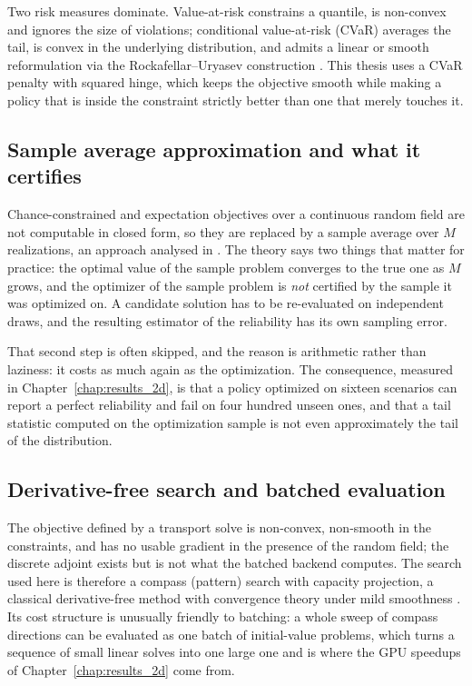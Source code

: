 \documentclass[11pt]{article}
\begin{document}
Two risk measures dominate. Value-at-risk constrains a quantile, is
non-convex and ignores the size of violations; conditional value-at-risk (CVaR)
averages the tail, is convex in the underlying distribution, and admits a linear
or smooth reformulation via the Rockafellar--Uryasev construction
\citep{rockafellar1991,rockafellar2000}. This thesis uses a CVaR penalty with
squared hinge, which keeps the objective smooth while making a policy that is
inside the constraint strictly better than one that merely touches it.

\subsection{Sample average approximation and what it certifies}

Chance-constrained and expectation objectives over a continuous random field are
not computable in closed form, so they are replaced by a sample average over $M$
realizations, an approach analysed in \citep{kleywegt2002,birge2011,shapiro2009,
nemirovski2009}. The theory says two things that matter for practice: the
optimal value of the sample problem converges to the true one as $M$ grows, and
the optimizer of the sample problem is \emph{not} certified by the sample it was
optimized on. A candidate solution has to be re-evaluated on independent draws,
and the resulting estimator of the reliability has its own sampling error.

That second step is often skipped, and the reason is arithmetic rather than
laziness: it costs as much again as the optimization. The consequence, measured
in Chapter~\ref{chap:results_2d}, is that a policy optimized on sixteen scenarios can
report a perfect reliability and fail on four hundred unseen ones, and that a
tail statistic computed on the optimization sample is not even approximately the
tail of the distribution.

\subsection{Derivative-free search and batched evaluation}

The objective defined by a transport solve is non-convex, non-smooth in the
constraints, and has no usable gradient in the presence of the random field; the
discrete adjoint exists but is not what the batched backend computes. The search
used here is therefore a compass (pattern) search with capacity projection, a
classical derivative-free method with convergence theory under mild smoothness
\citep{conn2009,nocedal2006}. Its cost structure is unusually friendly to
batching: a whole sweep of compass directions can be evaluated as one batch of
initial-value problems, which turns a sequence of small linear solves into one
large one and is where the GPU speedups of Chapter~\ref{chap:results_2d} come from.
\end{document}

